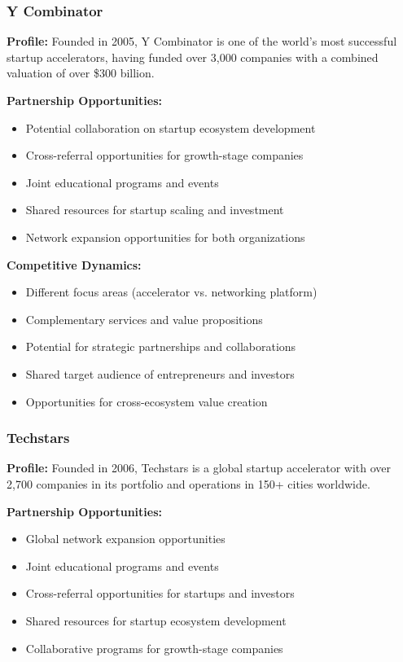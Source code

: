 \subsubsection{Y Combinator}
\textbf{Profile:} Founded in 2005, Y Combinator is one of the world's most successful startup accelerators, having funded over 3,000 companies with a combined valuation of over \$300 billion.

\textbf{Partnership Opportunities:}
\begin{itemize}
    \item Potential collaboration on startup ecosystem development
    \item Cross-referral opportunities for growth-stage companies
    \item Joint educational programs and events
    \item Shared resources for startup scaling and investment
    \item Network expansion opportunities for both organizations
\end{itemize}

\textbf{Competitive Dynamics:}
\begin{itemize}
    \item Different focus areas (accelerator vs. networking platform)
    \item Complementary services and value propositions
    \item Potential for strategic partnerships and collaborations
    \item Shared target audience of entrepreneurs and investors
    \item Opportunities for cross-ecosystem value creation
\end{itemize}

\subsubsection{Techstars}
\textbf{Profile:} Founded in 2006, Techstars is a global startup accelerator with over 2,700 companies in its portfolio and operations in 150+ cities worldwide.

\textbf{Partnership Opportunities:}
\begin{itemize}
    \item Global network expansion opportunities
    \item Joint educational programs and events
    \item Cross-referral opportunities for startups and investors
    \item Shared resources for startup ecosystem development
    \item Collaborative programs for growth-stage companies
\end{itemize}

